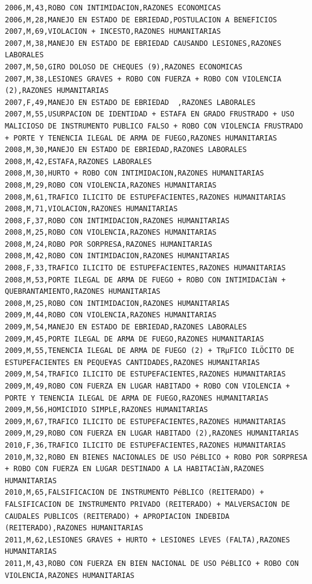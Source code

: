 \documentclass[11pt]{article}
\begin{document}
\begin{enumerate}
\begin{enumerate}
\begin{verbatim}
2006,M,43,ROBO CON INTIMIDACION,RAZONES ECONOMICAS
2006,M,28,MANEJO EN ESTADO DE EBRIEDAD,POSTULACION A BENEFICIOS
2007,M,69,VIOLACION + INCESTO,RAZONES HUMANITARIAS
2007,M,38,MANEJO EN ESTADO DE EBRIEDAD CAUSANDO LESIONES,RAZONES LABORALES
2007,M,50,GIRO DOLOSO DE CHEQUES (9),RAZONES ECONOMICAS
2007,M,38,LESIONES GRAVES + ROBO CON FUERZA + ROBO CON VIOLENCIA (2),RAZONES HUMANITARIAS
2007,F,49,MANEJO EN ESTADO DE EBRIEDAD  ,RAZONES LABORALES
2007,M,55,USURPACION DE IDENTIDAD + ESTAFA EN GRADO FRUSTRADO + USO MALICIOSO DE INSTRUMENTO PUBLICO FALSO + ROBO CON VIOLENCIA FRUSTRADO + PORTE Y TENENCIA ILEGAL DE ARMA DE FUEGO,RAZONES HUMANITARIAS 
2008,M,30,MANEJO EN ESTADO DE EBRIEDAD,RAZONES LABORALES
2008,M,42,ESTAFA,RAZONES LABORALES
2008,M,30,HURTO + ROBO CON INTIMIDACION,RAZONES HUMANITARIAS
2008,M,29,ROBO CON VIOLENCIA,RAZONES HUMANITARIAS
2008,M,61,TRAFICO ILICITO DE ESTUPEFACIENTES,RAZONES HUMANITARIAS 
2008,M,71,VIOLACION,RAZONES HUMANITARIAS 
2008,F,37,ROBO CON INTIMIDACION,RAZONES HUMANITARIAS 
2008,M,25,ROBO CON VIOLENCIA,RAZONES HUMANITARIAS 
2008,M,24,ROBO POR SORPRESA,RAZONES HUMANITARIAS
2008,M,42,ROBO CON INTIMIDACION,RAZONES HUMANITARIAS 
2008,F,33,TRAFICO ILICITO DE ESTUPEFACIENTES,RAZONES HUMANITARIAS 
2008,M,53,PORTE ILEGAL DE ARMA DE FUEGO + ROBO CON INTIMIDACIàN + QUEBRANTAMIENTO,RAZONES HUMANITARIAS 
2008,M,25,ROBO CON INTIMIDACION,RAZONES HUMANITARIAS
2009,M,44,ROBO CON VIOLENCIA,RAZONES HUMANITARIAS 
2009,M,54,MANEJO EN ESTADO DE EBRIEDAD,RAZONES LABORALES
2009,M,45,PORTE ILEGAL DE ARMA DE FUEGO,RAZONES HUMANITARIAS 
2009,M,55,TENENCIA ILEGAL DE ARMA DE FUEGO (2) + TRµFICO ILÖCITO DE ESTUPEFACIENTES EN PEQUE¥AS CANTIDADES,RAZONES HUMANITARIAS 
2009,M,54,TRAFICO ILICITO DE ESTUPEFACIENTES,RAZONES HUMANITARIAS 
2009,M,49,ROBO CON FUERZA EN LUGAR HABITADO + ROBO CON VIOLENCIA + PORTE Y TENENCIA ILEGAL DE ARMA DE FUEGO,RAZONES HUMANITARIAS 
2009,M,56,HOMICIDIO SIMPLE,RAZONES HUMANITARIAS 
2009,M,67,TRAFICO ILICITO DE ESTUPEFACIENTES,RAZONES HUMANITARIAS 
2009,M,29,ROBO CON FUERZA EN LUGAR HABITADO (2),RAZONES HUMANITARIAS 
2010,F,36,TRAFICO ILICITO DE ESTUPEFACIENTES,RAZONES HUMANITARIAS
2010,M,32,ROBO EN BIENES NACIONALES DE USO PéBLICO + ROBO POR SORPRESA + ROBO CON FUERZA EN LUGAR DESTINADO A LA HABITACIàN,RAZONES HUMANITARIAS 
2010,M,65,FALSIFICACION DE INSTRUMENTO PéBLICO (REITERADO) + FALSIFICACION DE INSTRUMENTO PRIVADO (REITERADO) + MALVERSACION DE CAUDALES PUBLICOS (REITERADO) + APROPIACION INDEBIDA (REITERADO),RAZONES HUMANITARIAS
2011,M,62,LESIONES GRAVES + HURTO + LESIONES LEVES (FALTA),RAZONES HUMANITARIAS 
2011,M,43,ROBO CON FUERZA EN BIEN NACIONAL DE USO PéBLICO + ROBO CON VIOLENCIA,RAZONES HUMANITARIAS 

\end{verbatim}
\end{enumerate}
\end{enumerate}
\end{document}
